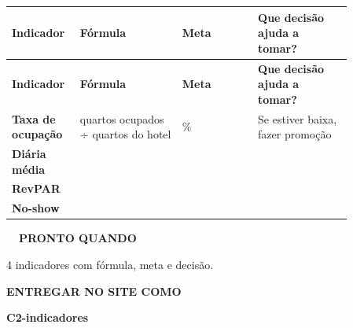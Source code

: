 \documentclass[11pt,a4paper]{article}
\begin{document}
\begin{longtable}{>{\raggedright\arraybackslash}p{0.126\linewidth}>{\raggedright\arraybackslash}p{0.275\linewidth}>{\raggedright\arraybackslash}p{0.204\linewidth}>{\raggedright\arraybackslash}p{0.251\linewidth}}
\rowcolor{cor} \color{white}\textbf{\footnotesize Indicador} & \color{white}\textbf{\footnotesize Fórmula} & \color{white}\textbf{\footnotesize Meta} & \color{white}\textbf{\footnotesize Que decisão ajuda a tomar?} \\
\endfirsthead
\rowcolor{cor} \color{white}\textbf{\footnotesize Indicador} & \color{white}\textbf{\footnotesize Fórmula} & \color{white}\textbf{\footnotesize Meta} & \color{white}\textbf{\footnotesize Que decisão ajuda a tomar?} \\
\endhead
\rowcolor{white}\textbf{Taxa de ocupação} & quartos ocupados ÷ quartos do hotel & 70\% & Se estiver baixa, fazer promoção \\ \hline
\rowcolor{suave!55}\rule{0pt}{24pt}\textbf{Diária média} &  &  &  \\ \hline
\rowcolor{white}\rule{0pt}{24pt}\textbf{RevPAR} &  &  &  \\ \hline
\rowcolor{suave!55}\rule{0pt}{24pt}\textbf{No-show} &  &  &  \\ \hline
\end{longtable}
\endgroup
\begin{lrbox}{\blocofinal}\begin{minipage}{\linewidth}
\begin{tcolorbox}[enhanced,colback=suave!45,colframe=cor!35,boxrule=0.8pt,arc=8pt,left=10pt,right=10pt,top=8pt,bottom=8pt,before skip=0pt,after skip=0pt]
\begin{minipage}[t]{0.56\linewidth}\vspace{0pt}
{\footnotesize\bfseries\color{cor}\faCheckDouble\ \ PRONTO QUANDO}\par\vspace{2pt}
\begin{checklist}
  \item 4 indicadores com fórmula, meta e decisão.
\end{checklist}
\end{minipage}\hfill
\begin{minipage}[t]{0.40\linewidth}\vspace{0pt}
\begin{selo}\centering
{\LARGE\color{cor}\faUpload}\par\vspace{3pt}
{\scriptsize\bfseries\color{cor}ENTREGAR NO SITE COMO}\par\vspace{2pt}
{\bfseries C2-indicadores}
\end{selo}
\end{minipage}
\end{tcolorbox}
\end{minipage}\end{lrbox}
\end{document}
